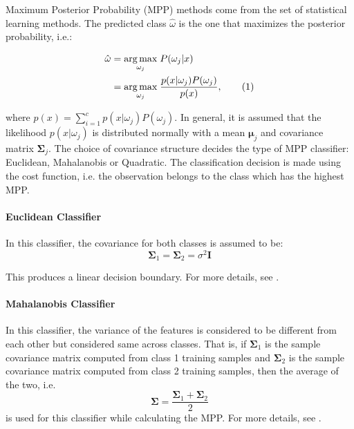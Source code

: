 \documentclass{article}
\newcommand\numberthis{\addtocounter{equation}{1}\tag{\theequation}}
\begin{document}
Maximum Posterior Probability (MPP) methods come from the set of statistical learning methods. The predicted class $\hat{\omega}$ is the one that maximizes the posterior probability, i.e.:

\begin{align*}
\hat{\omega} &= \underset{\omega_j}{\arg\max} \; P(\omega_j|x) \\
  &= \underset{\omega_j}{\arg\max} \; \frac{p(x|\omega_j)P(\omega_j)}{p(x)}, \numberthis \label{mpp}
\end{align*}


where $p(x) = \sum_{i = 1}^c p(x|\omega_j)P(\omega_j)$. In general, it is assumed that the likelihood $p(x|\omega_j)$ is distributed normally with a mean $\boldsymbol\mu_j$ and covariance matrix $\boldsymbol\Sigma_j$. The choice of covariance structure decides the type of MPP classifier: Euclidean, Mahalanobis or Quadratic. The classification decision is made using the cost function, i.e. the observation belongs to the class which has the highest MPP.

\paragraph{Euclidean Classifier} In this classifier, the covariance for both classes is assumed to be:
\begin{equation}
    \boldsymbol\Sigma_1 = \boldsymbol\Sigma_2 = \sigma^2 \mathbf I
\end{equation}

This produces a linear decision boundary. For more details, see \citet{bishop2006pattern}.

\paragraph{Mahalanobis Classifier} In this classifier, the variance of the features is considered to be different from each other but considered same across classes. That is, if $\boldsymbol\Sigma_1$ is the sample covariance matrix computed from class 1 training samples and $\boldsymbol\Sigma_2$ is the sample covariance matrix computed from class 2 training samples, then the average of the two, i.e.
\begin{equation}
    \boldsymbol\Sigma = \frac{\boldsymbol\Sigma_1 + \boldsymbol\Sigma_2}{2} 
\end{equation}
is used for this classifier while calculating the MPP. For more details, see \citet{bishop2006pattern}.
\end{document}
